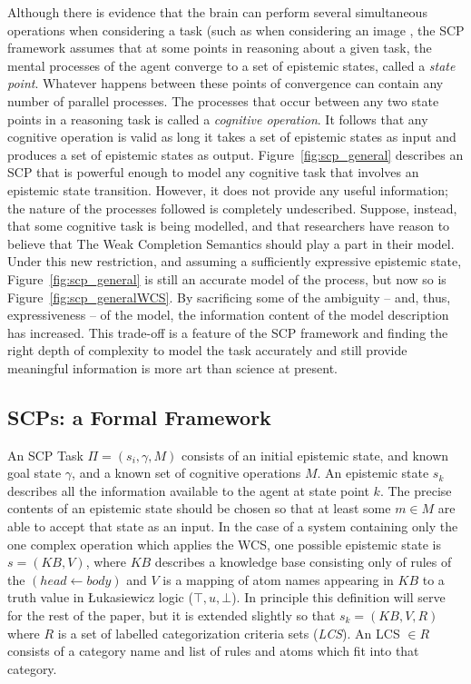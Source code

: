 \documentclass{article}
\begin{document}
Although there is evidence that the brain can perform several simultaneous operations when considering a task (such as when considering an image \citep{sigman2008brain}, the SCP framework assumes that at some points in reasoning about a given task, the mental processes of the agent converge to a set of epistemic states, called a \textit{state point}. Whatever happens between these points of convergence can contain any number of parallel processes. The processes that occur between any two state points in a reasoning task is called a \textit{cognitive operation}. It follows that any cognitive operation is valid as long it takes a set of epistemic states as input and produces a set of epistemic states as output. Figure~\ref{fig:scp_general} describes an SCP that is powerful enough to model any cognitive task that involves an epistemic state transition. However, it does not provide any useful information; the nature of the processes followed is completely undescribed. Suppose, instead, that some cognitive task is being modelled, and that researchers have reason to believe that The Weak Completion Semantics should play a part in their model. Under this new restriction, and assuming a sufficiently expressive epistemic state, Figure~\ref{fig:scp_general} is still an accurate model of the process, but now so is Figure~\ref{fig:scp_generalWCS}. By sacrificing some of the ambiguity -- and, thus, expressiveness -- of the model, the information content of the model description has increased. This trade-off is a feature of the SCP framework and finding the right depth of complexity to model the task accurately and still provide meaningful information is more art than science at present. 

\subsection{SCPs: a Formal Framework}
An SCP Task $\Pi=(s_i, \gamma, M)$ consists of an initial epistemic state, and known goal state $\gamma$, and a known set of cognitive operations $M$. An epistemic state $s_k$ describes all the information available to the agent at state point $k$. The precise contents of an epistemic state should be chosen so that at least some $m \in M$ are able to accept that state as an input. In the case of a system containing only the one complex operation which applies the WCS, one possible epistemic state is $s=(KB,V)$, where $KB$ describes a knowledge base consisting only of rules of the $(head \leftarrow body)$ and $V$ is a mapping of atom names appearing in $KB$ to a truth value in \L ukasiewicz logic ($\top,u, \bot$). In principle this definition will serve for the rest of the paper, but it is extended slightly so that $s_k = (KB,V,R)$ where $R$ is a set of labelled categorization criteria sets (\textit{LCS}). An LCS $\in R$ consists of a category name and list of rules and atoms which fit into that category.
\end{document}
